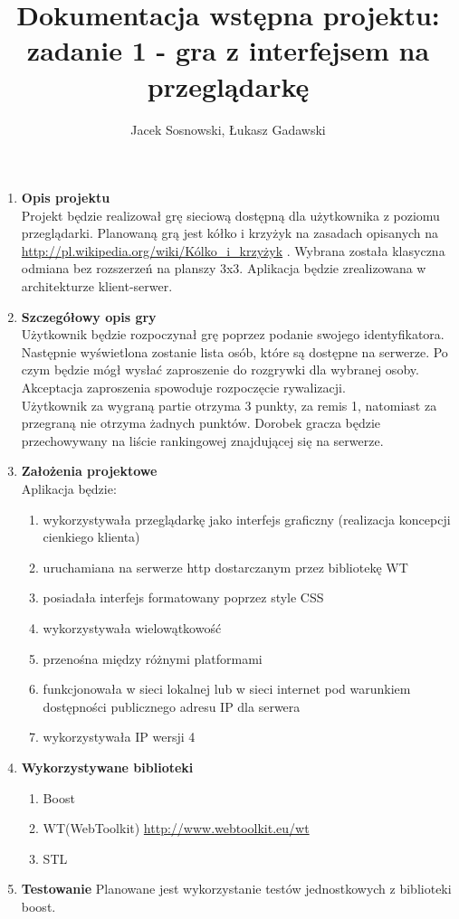 \documentclass{report}
\author{Jacek Sosnowski, Łukasz Gadawski}
\title{Dokumentacja wstępna projektu: \\
\textbf{zadanie 1 - gra z interfejsem na przeglądarkę}}
\begin{document}
\maketitle

\begin{enumerate}
\item \textbf{Opis projektu} \\
Projekt będzie realizował grę sieciową dostępną dla użytkownika z poziomu przeglądarki.
Planowaną grą jest kółko i krzyżyk na zasadach opisanych na \url{http://pl.wikipedia.org/wiki/Kólko_i_krzyżyk} .
Wybrana została klasyczna odmiana bez rozszerzeń na planszy 3x3. Aplikacja będzie zrealizowana w architekturze klient-serwer.

\item \textbf{Szczegółowy opis gry} \\
Użytkownik będzie rozpoczynał grę poprzez podanie swojego identyfikatora. Następnie wyświetlona zostanie lista osób, 
które są dostępne na serwerze. Po czym będzie mógł wysłać zaproszenie do rozgrywki dla wybranej osoby. Akceptacja
zaproszenia spowoduje rozpoczęcie rywalizacji. \\
Użytkownik za wygraną partie otrzyma 3 punkty, za remis 1, natomiast za przegraną nie otrzyma żadnych punktów. 
Dorobek gracza będzie przechowywany na liście rankingowej znajdującej się na serwerze. 

\item \textbf{ Założenia projektowe}	\\
Aplikacja będzie:
\begin{enumerate}
\item wykorzystywała przeglądarkę jako interfejs graficzny (realizacja koncepcji cienkiego klienta)
\item uruchamiana na serwerze http dostarczanym przez bibliotekę WT
\item posiadała interfejs formatowany poprzez style CSS
\item wykorzystywała wielowątkowość
\item przenośna między różnymi platformami
\item funkcjonowała w sieci lokalnej lub w sieci internet pod warunkiem dostępności publicznego adresu IP dla serwera
\item wykorzystywała IP wersji 4
\end{enumerate}

\item \textbf{Wykorzystywane biblioteki}
\begin{enumerate}
\item Boost 
\item WT(WebToolkit) \url{http://www.webtoolkit.eu/wt}
\item STL
\end{enumerate}

\item \textbf{Testowanie}
Planowane jest wykorzystanie testów jednostkowych z biblioteki boost. 
\end{enumerate}
\end{document}
